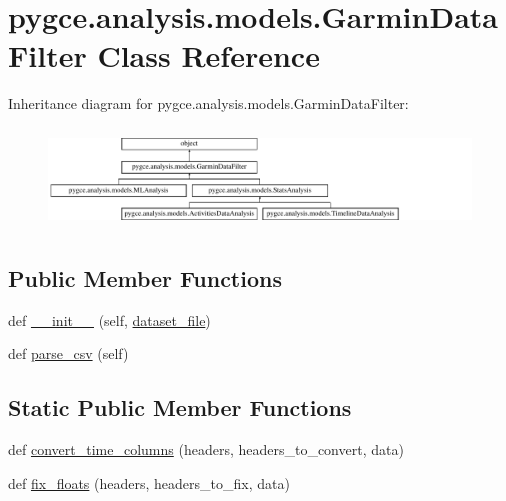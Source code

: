 \hypertarget{classpygce_1_1analysis_1_1models_1_1_garmin_data_filter}{}\section{pygce.\+analysis.\+models.\+Garmin\+Data\+Filter Class Reference}
\label{classpygce_1_1analysis_1_1models_1_1_garmin_data_filter}
Inheritance diagram for pygce.\+analysis.\+models.\+Garmin\+Data\+Filter\+:\begin{figure}[H]
\begin{center}
\leavevmode
\includegraphics[height=2.695548cm]{classpygce_1_1analysis_1_1models_1_1_garmin_data_filter}
\end{center}
\end{figure}
\subsection*{Public Member Functions}
\begin{DoxyCompactItemize}
\item 
def \hyperlink{classpygce_1_1analysis_1_1models_1_1_garmin_data_filter_ae5dcf7d3dd4f98145960b2a751b163d2}{\+\_\+\+\_\+init\+\_\+\+\_\+} (self, \hyperlink{classpygce_1_1analysis_1_1models_1_1_garmin_data_filter_a7bb7be05577c2d31546e27823a5d11c5}{dataset\+\_\+file})
\item 
def \hyperlink{classpygce_1_1analysis_1_1models_1_1_garmin_data_filter_ae502093f9a92b498b42dd8b0257c22dd}{parse\+\_\+csv} (self)
\end{DoxyCompactItemize}
\subsection*{Static Public Member Functions}
\begin{DoxyCompactItemize}
\item 
def \hyperlink{classpygce_1_1analysis_1_1models_1_1_garmin_data_filter_aba928d8e942c743cf1553760cdb95ea1}{convert\+\_\+time\+\_\+columns} (headers, headers\+\_\+to\+\_\+convert, data)
\item 
def \hyperlink{classpygce_1_1analysis_1_1models_1_1_garmin_data_filter_a7220b9a58e6a9e4fe5dd679b7c8dd3ae}{fix\+\_\+floats} (headers, headers\+\_\+to\+\_\+fix, data)
\end{DoxyCompactItemize}
